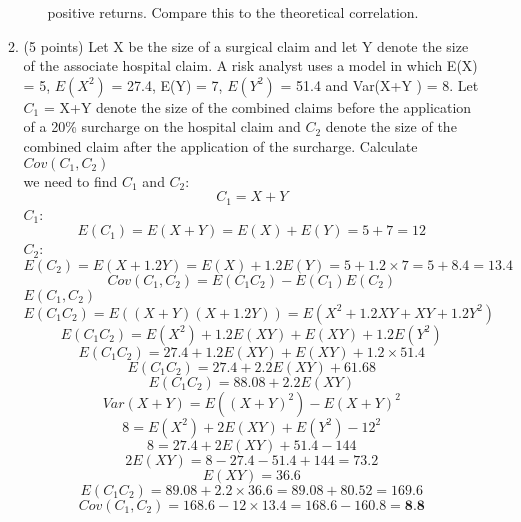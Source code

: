 \documentclass[a3paper,12pt]{article} %
\begin{document}
\begin{enumerate}
\begin{enumerate}
\begin{enumerate}
        positive returns. Compare this to the theoretical correlation.
    \end{enumerate}
    \item (5 points) Let X be the size of a surgical claim and let Y denote the size of the associate hospital
    claim. A risk analyst uses a model in which E(X) = 5, \(E(X^2)\) = 27.4, E(Y) = 7, \(E(Y^2)\) = 51.4
    and Var(X+Y ) = 8. Let \(C_1\) = X+Y denote the size of the combined claims before the application
    of a 20\% surcharge on the hospital claim and \(C_2\) denote the size of the combined claim after the
    application of the surcharge. Calculate \(Cov(C_1, C_2)\)
    \\ we need to find \(C_1\) and \(C_2\):
    \[
        C_1 = X + Y
    \]
    \(C_1\):
    \[
        E(C_1) = E(X + Y) = E(X) + E(Y) = 5 + 7 = 12
    \]
    \(C_2\):
    \[
        E(C_2) = E(X + 1.2Y) = E(X) + 1.2E(Y) = 5 + 1.2 \times 7 = 5 + 8.4 = 13.4
    \]
    \[
        Cov(C_1, C_2) = E(C_1C_2) - E(C_1)E(C_2)
    \]
    \(E(C_1, C_2)\)
    \[
        E(C_1C_2) = E((X + Y)(X + 1.2Y)) = E(X^2 + 1.2XY + XY + 1.2Y^2)
    \]
    \[
        E(C_1C_2) = E(X^2) + 1.2E(XY) + E(XY) + 1.2E(Y^2)
    \]
    \[
        E(C_1C_2) = 27.4 + 1.2E(XY) + E(XY) + 1.2 \times 51.4
    \]
    \[
        E(C_1C_2) = 27.4 + 2.2E(XY) + 61.68
    \]
    \[
        E(C_1C_2) = 88.08 + 2.2E(XY)
    \]
    \[
        Var(X + Y) = E((X+Y)^2) - E(X+Y)^2 
    \]
    \[
        8 = E(X^2) + 2E(XY) + E(Y^2) - 12^2
    \]
    \[
        8 = 27.4 + 2E(XY) + 51.4 - 144
    \]
    \[
        2E(XY) = 8 - 27.4 - 51.4 + 144 = 73.2
    \]
    \[
        E(XY) = 36.6
    \]
    \[
        E(C_1C_2) = 89.08 + 2.2 \times 36.6 = 89.08 + 80.52 = 169.6
    \]
    \[
        Cov(C_1, C_2) = 168.6 - 12 \times 13.4 = 168.6 - 160.8 = \textbf{8.8}
    \]

\end{enumerate}
\end{enumerate}
\end{document}
